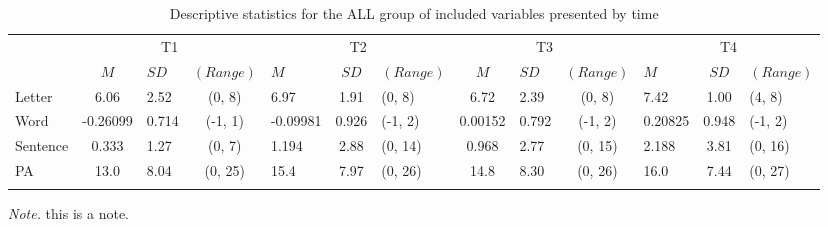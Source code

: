 \documentclass[
  english,
  ,man]{apa6}
\begin{document}
\begin{table}[tbp]

\begin{center}
\begin{threeparttable}

\caption{\label{tab:desc-read-ALL-table}Descriptive statistics for the ALL group of included variables presented by time}

\small{

\begin{tabular}{lclclclclclcl}
\toprule
 & \multicolumn{3}{c}{T1} & \multicolumn{3}{c}{T2} & \multicolumn{3}{c}{T3} & \multicolumn{3}{c}{T4} \\
\cmidrule(r){2-4} \cmidrule(r){5-7} \cmidrule(r){8-10} \cmidrule(r){11-13}
  & $M$ & $SD$ & $(Range)$ & $M$ & $SD$ & $(Range)$ & $M$ & $SD$ & $(Range)$ & $M$ & $SD$ & $(Range)$\\
\midrule
Letter & 6.06 & 2.52 & (0, 8) & 6.97 & 1.91 & (0, 8) & 6.72 & 2.39 & (0, 8) & 7.42 & 1.00 & (4, 8)\\
Word & -0.26099 & 0.714 & (-1, 1) & -0.09981 & 0.926 & (-1, 2) & 0.00152 & 0.792 & (-1, 2) & 0.20825 & 0.948 & (-1, 2)\\
Sentence & 0.333 & 1.27 & (0, 7) & 1.194 & 2.88 & (0, 14) & 0.968 & 2.77 & (0, 15) & 2.188 & 3.81 & (0, 16)\\
PA & 13.0 & 8.04 & (0, 25) & 15.4 & 7.97 & (0, 26) & 14.8 & 8.30 & (0, 26) & 16.0 & 7.44 & (0, 27)\\
\bottomrule
\addlinespace
\end{tabular}

}

\begin{tablenotes}[para]
\normalsize{\textit{Note.} this is a note.}
\end{tablenotes}

\end{threeparttable}
\end{center}

\end{table}
\end{document}
